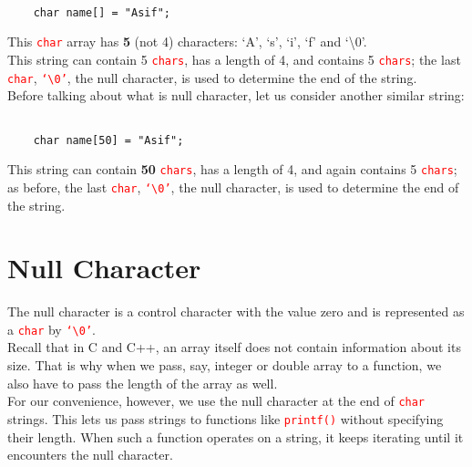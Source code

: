 \documentclass[12pt]{article}
\begin{document}
\begin{verbatim}

    char name[] = "Asif";

\end{verbatim}

\noindent This \textcolor{red}{\texttt{char}} array has \textbf{5} (not 4) characters: `A', `s', `i', `f' and `\textbackslash 0'.  \\

\noindent This string can contain 5 \textcolor{red}{\texttt{chars}}, has a length of 4, and contains 5 \textcolor{red}{\texttt{chars}}; the last \textcolor{red}{\texttt{char}}, \textcolor{red}{\texttt{`\textbackslash 0'}}, 
the null character, is used to determine the end of the string. \\

\noindent Before talking about what is null character, let us consider another similar string:

\begin{verbatim}
    
    char name[50] = "Asif";

\end{verbatim}

\noindent This string can contain \textbf{50} \textcolor{red}{\texttt{chars}}, has a length of 4, and again contains 5 \textcolor{red}{\texttt{chars}}; as before, the last \textcolor{red}{\texttt{char}}, 
\textcolor{red}{\texttt{`\textbackslash 0'}}, the null character, is used to determine the end of the string. \\

\section*{Null Character}

\noindent The null character is a control character with the value zero and is represented as a \textcolor{red}{\texttt{char}} by \textcolor{red}{\texttt{`\textbackslash 0'}}. \\

\noindent Recall that in C and C++, an array itself does not contain information about its size. That is why when we pass, say, integer or double array to a function, we also have to pass the 
length of the array as well. \\ 

\noindent For our convenience, however, we use the null character at the end of \textcolor{red}{\texttt{char}} strings. This lets us pass strings to functions like 
\textcolor{red}{\texttt{printf()}} without specifying their length. When such a function operates on a string, it keeps iterating until it encounters the null character.   
\end{document}
